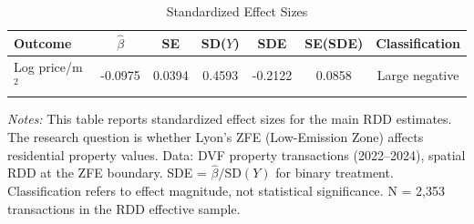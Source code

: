 \begin{table}[htbp]
\centering
\caption{Standardized Effect Sizes}
\label{tab:sde}
\begin{tabular}{lcccccc}
\toprule
Outcome & $\hat{\beta}$ & SE & SD($Y$) & SDE & SE(SDE) & Classification \\
\midrule
Log price/m$^2$ & -0.0975 & 0.0394 & 0.4593 & -0.2122 & 0.0858 & Large negative \\
\bottomrule
\end{tabular}
\begin{tablenotes}[flushleft]\small
\item \textit{Notes:} This table reports standardized effect sizes for the main RDD estimates. The research question is whether Lyon's ZFE (Low-Emission Zone) affects residential property values. Data: DVF property transactions (2022--2024), spatial RDD at the ZFE boundary. SDE = $\hat{\beta} / \text{SD}(Y)$ for binary treatment. Classification refers to effect magnitude, not statistical significance. N = 2,353 transactions in the RDD effective sample.
\end{tablenotes}
\end{table}

